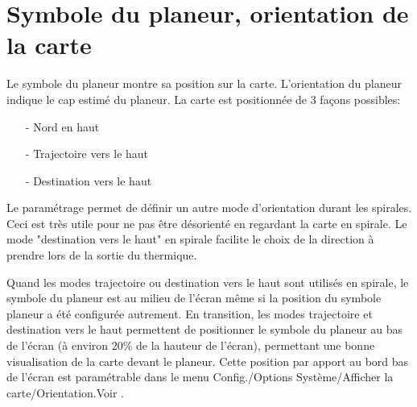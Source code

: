 \section{Symbole du planeur, orientation de la carte}
Le symbole du planeur montre sa position sur la carte. L'orientation du planeur indique le cap estimé du planeur.
La carte est positionnée de 3 façons possibles: 
\begin{enumerate}
\item [-] Nord en haut
\item [-] Trajectoire vers le haut
\item [-] Destination vers le haut
\end{enumerate}
Le paramétrage   permet de définir un autre mode d'orientation durant les spirales. Ceci est très utile pour ne pas être désorienté en regardant la carte en spirale. Le mode "destination vers le haut" en spirale facilite le choix de la direction à prendre lors de la sortie du thermique.

Quand les modes trajectoire ou destination vers le haut sont utilisés en spirale, le symbole du planeur est au milieu de l'écran même si la position du symbole planeur a été configurée autrement.  En transition, les modes trajectoire et destination vers le haut permettent de positionner le symbole du planeur au bas de l'écran (à environ 20\% de la hauteur de l'écran), permettant une bonne visualisation de la carte devant le planeur. Cette position par apport au bord bas de l'écran est paramétrable dans le menu Config./Options Système/Afficher la carte/Orientation.Voir .

